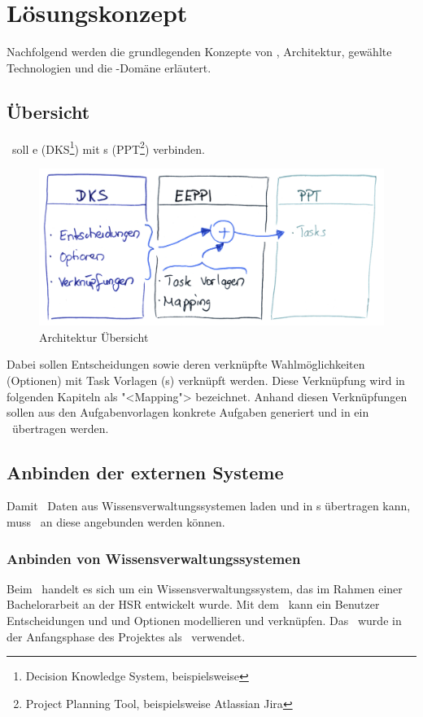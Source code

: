 \chapter{Lösungskonzept}
	
	Nachfolgend werden die grundlegenden Konzepte von \eeppi , Architektur, gewählte Technologien und die \eeppi -Domäne erläutert.
	
	
	\section{Übersicht}
		\eeppi\ soll \dks e (DKS\footnote{Decision Knowledge System, beispielsweise \cdar}) mit \ppt s (PPT\footnote{Project Planning Tool, beispielsweise Atlassian Jira}) verbinden.
		
		\begin{figure}[H]
			\includegraphics[width=\textwidth]{architecture/media/img/eeppiSchema.jpg}
			\centering
			\caption{Architektur Übersicht}
			\label{fig:architectureSchema}
		\end{figure}	
		
		Dabei sollen Entscheidungen sowie deren verknüpfte Wahlmöglichkeiten (Optionen) mit Task Vorlagen (\ttpl s) verknüpft werden.
		Diese Verknüpfung wird in folgenden Kapiteln als "<Mapping"> bezeichnet. 
		Anhand diesen Verknüpfungen sollen aus den Aufgabenvorlagen konkrete Aufgaben generiert und in ein \ppt\ übertragen werden.
	
	
	\section{Anbinden der externen Systeme}
		Damit \eeppi\ Daten aus Wissensverwaltungssystemen laden und in \ppt s übertragen kann, muss \eeppi\ an diese angebunden werden können.
		
	
		\subsection{Anbinden von Wissensverwaltungssystemen}
			Beim \cdar\ handelt es sich um ein Wissensverwaltungssystem, 
			das im Rahmen einer Bachelorarbeit \cite{tinner_collaborative_2014} an der HSR entwickelt wurde. Mit dem \cdar\ kann ein Benutzer Entscheidungen und und Optionen modellieren und verknüpfen. Das \cdar\ wurde in der Anfangsphase des Projektes als \dks\ verwendet.
			

